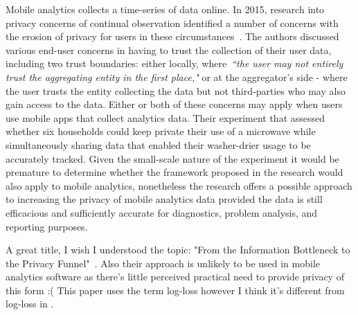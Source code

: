 Mobile analytics collects a time-series of data online. In 2015, research into privacy concerns of continual observation identified a number of concerns with the erosion of privacy for users in these circumstances~. The authors discussed various end-user concerns in having to trust the collection of their user data, including two trust boundaries: either locally, where~\emph{``the user may not entirely trust the aggregating entity in the first place,"} or at the aggregator's side - where the user trusts the entity collecting the data but not third-parties who may also gain access to the data. Either or both of these concerns may apply when users use mobile apps that collect analytics data. Their experiment that assessed whether six households could keep private their use of a microwave while simultaneously sharing data that enabled their washer-drier usage to be accurately tracked. Given the small-scale nature of the experiment it would be premature to determine whether the framework proposed in the research would also apply to mobile analytics, nonetheless the research offers a possible approach to increasing the privacy of mobile analytics data provided the data is still efficacious and sufficiently accurate for diagnostics, problem analysis, and reporting purposes.  %

A great title, I wish I understood the topic: "From the Information Bottleneck to the Privacy Funnel"~\cite{makhdoumi2014_from_information_bottleneck_to_the_privacy_funnel}. Also their approach is unlikely to be used in mobile analytics software as there's little perceived practical need to provide privacy of this form :( This paper uses the term log-loss however I think it's different from log-loss in .


